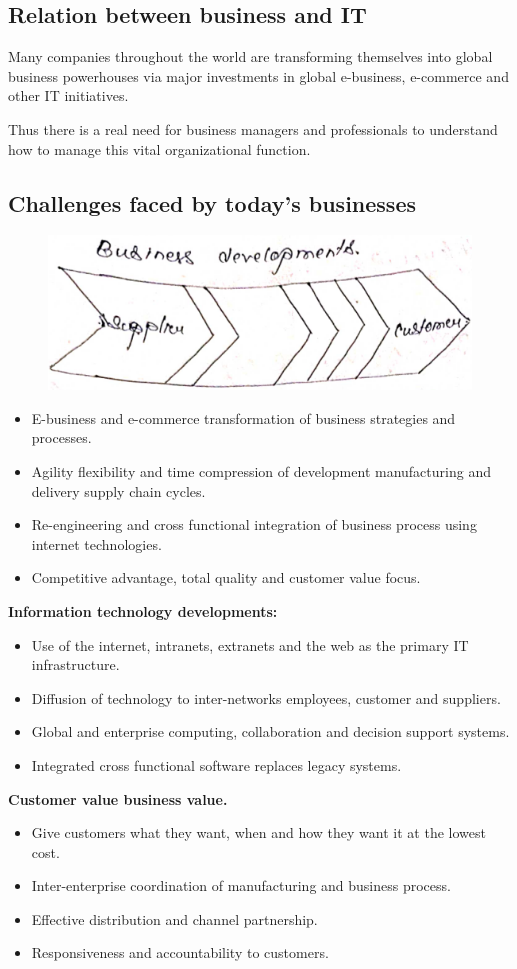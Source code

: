 \documentclass[12pt, a4paper]{article}
\begin{document}
\subsection{Relation between business and IT}%
Many companies throughout the world are transforming themselves into global 
business powerhouses via major investments in global e-business, e-commerce
and other IT initiatives.

Thus there is a real need for business managers and professionals to
understand how to manage this vital organizational function.
\subsection{Challenges faced by today's businesses}
\begin{figure}[h]
  \centering
  \includegraphics[scale=0.45]{buisdev}
\end{figure}
\begin{itemize}
  \item E-business and e-commerce transformation of business strategies and
    processes.
  \item Agility flexibility and time compression of development manufacturing
    and delivery supply chain cycles.
  \item Re-engineering and cross functional integration of business process 
    using internet technologies.
  \item Competitive advantage, total quality and customer value focus.
\end{itemize}
\textbf{Information technology developments:}
\begin{itemize}
  \item Use of the internet, intranets, extranets and the web as the primary IT
    infrastructure.
  \item Diffusion of technology to inter-networks employees, customer and
    suppliers.
  \item Global and enterprise computing, collaboration and decision support 
    systems.
  \item Integrated cross functional software replaces legacy systems.
\end{itemize}
\textbf{Customer value business value.}
\begin{itemize}
  \item Give customers what they want, when and how they want it at the lowest
    cost.
  \item Inter-enterprise coordination of manufacturing and business process.
  \item Effective distribution and channel partnership.
  \item Responsiveness and accountability to customers.
\end{itemize}%
\end{document}
